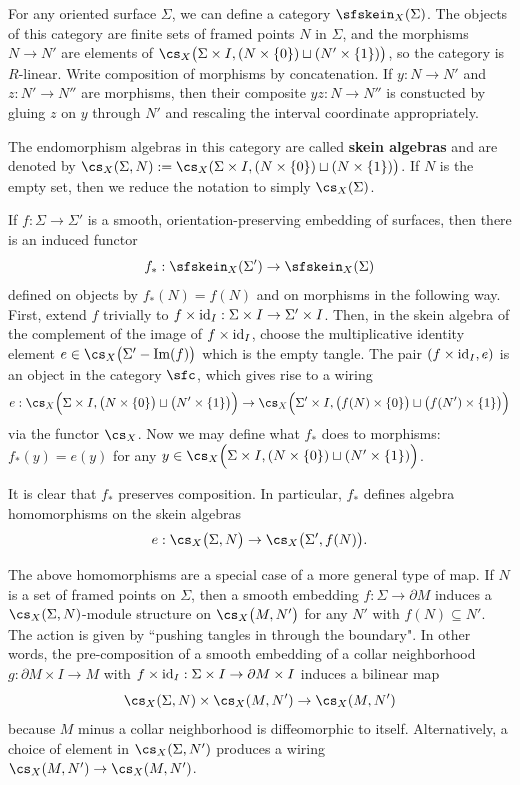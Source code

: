 For any oriented surface $\Sigma$, we can define a category $\sfskein_X(\Sigma)$. The objects of this category are finite sets of framed points $N$ in $\Sigma$, and the morphisms $N \to N'$ are elements of $\cs_X\big(\Sigma \times I, (N \times \{0\}) \sqcup (N' \times \{1\})\big)$, so the category is $R$-linear. Write composition of morphisms by concatenation. If $y:N \to N'$ and $z:N' \to N''$ are morphisms, then their composite $yz:N \to N''$ is constucted by gluing $z$ on $y$ through $N'$ and rescaling the interval coordinate appropriately.


The endomorphism algebras in this category are called \textbf{skein algebras} and are denoted by $\cs_X(\Sigma, N) := \cs_X(\Sigma \times I, (N \times \{0\}) \sqcup (N \times \{1\}) \big)$. If $N$ is the empty set, then we reduce the notation to simply $\cs_X(\Sigma)$.

If $f: \Sigma \to \Sigma'$ is a smooth, orientation-preserving embedding of surfaces, then there is an induced functor 
\[
f_*: \sfskein_X(\Sigma') \to \sfskein_X(\Sigma)
\]
defined on objects by $f_*(N) = f(N)$ and on morphisms in the following way. First, extend $f$ trivially to $f \times {\rm{id}}_I: \Sigma \times I \to \Sigma' \times I$. Then, in the skein algebra of the complement of the image of $f \times {\rm{id}}_I$, choose the multiplicative identity element $e \in \cs_X\big( \Sigma' - \im(f) \big)$ which is the empty tangle. The pair $(f \times {\rm{id}}_I, e)$ is an object in the category $\sfc$, which gives rise to a wiring
\[e: \cs_X\Big(\Sigma \times I, \big(N \times \{0\}\big) \sqcup \big(N' \times \{1\}\big) \Big) \to \cs_X\Big(\Sigma' \times I, \big(f(N) \times \{0\}\big) \sqcup \big( f(N') \times \{1\} \big) \Big)\]
via the functor $\cs_X$. Now we may define what $f_*$ does to morphisms: $f_*(y) = e(y)$ for any $y \in \cs_X\Big(\Sigma \times I, (N \times \{0\}) \sqcup (N' \times \{1\}) \Big)$.


It is clear that $f_*$ preserves composition. In particular, $f_*$ defines algebra homomorphisms on the skein algebras
\[e: \cs_X\big(\Sigma, N\big) \to \cs_X\big(\Sigma', f(N)\big).\]


The above homomorphisms are a special case of a more general type of map. If $N$ is a set of framed points on $\Sigma$, then a smooth embedding $f: \Sigma \to \partial M$ induces a $\cs_X(\Sigma, N)$-module structure on $\cs_X\big(M, N'\big)$ for any $N'$ with $f(N) \subseteq N'$. The action is given by ``pushing tangles in through the boundary". In other words, the pre-composition of a smooth embedding of a collar neighborhood $g: \partial M \times I \to M$ with $f \times {\rm{id}}_I: \Sigma\times I \to \partial M \times I$ induces a bilinear map
\[
\cs_X(\Sigma, N) \times \cs_X(M, N') \to \cs_X(M, N')
\]
because $M$ minus a collar neighborhood is diffeomorphic to itself. Alternatively, a choice of element in $\cs_X(\Sigma, N')$ produces a wiring $\cs_X(M, N') \to \cs_X(M, N')$.

